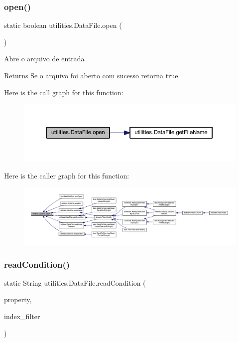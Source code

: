\subsubsection{\texorpdfstring{open()}{open()}}
{\footnotesize\ttfamily static boolean utilities.\+Data\+File.\+open (\begin{DoxyParamCaption}{ }\end{DoxyParamCaption})\hspace{0.3cm}{\ttfamily [static]}}

Abre o arquivo de entrada \begin{DoxyReturn}{Returns}
Se o arquivo foi aberto com sucesso retorna true 
\end{DoxyReturn}
Here is the call graph for this function\+:\nopagebreak
\begin{figure}[H]
\begin{center}
\leavevmode
\includegraphics[width=350pt]{classutilities_1_1_data_file_aa53fb6327a320f458fd8314751e241c9_cgraph}
\end{center}
\end{figure}
Here is the caller graph for this function\+:\nopagebreak
\begin{figure}[H]
\begin{center}
\leavevmode
\includegraphics[width=350pt]{classutilities_1_1_data_file_aa53fb6327a320f458fd8314751e241c9_icgraph}
\end{center}
\end{figure}
\mbox{\label{classutilities_1_1_data_file_ae44a128705ef07c67393153806fb5216}} 
\subsubsection{\texorpdfstring{read\+Condition()}{readCondition()}}
{\footnotesize\ttfamily static String utilities.\+Data\+File.\+read\+Condition (\begin{DoxyParamCaption}\item[{\hyperlink{enumutilities_1_1_file_property}{File\+Property}}]{property,  }\item[{int}]{index\+\_\+filter }\end{DoxyParamCaption})\hspace{0.3cm}{\ttfamily [static]}}


